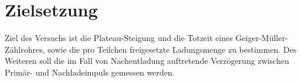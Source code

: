 
\section{Zielsetzung}
\label{sec:Zielsetzung}

Ziel des Versuchs ist die Plateau-Steigung und die Totzeit eines Geiger-Müller-Zählrohres, sowie die pro Teilchen freigesetzte Ladungsmenge zu bestimmen. Des Weiteren soll die im Fall von Nachentladung auftretende Verzögerung zwischen Primär- und Nachladeimpuls gemessen werden.
